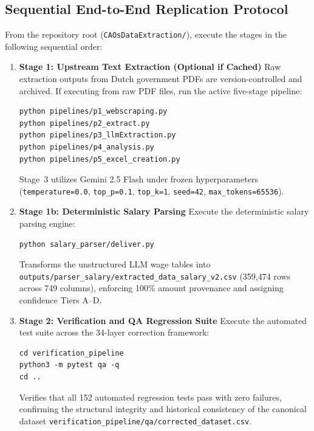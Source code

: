 \subsection{Sequential End-to-End Replication Protocol}
\label{sec:replication_steps}

From the repository root (\nolinkurl{CAOsDataExtraction/}), execute the stages in the following sequential order:

\begin{enumerate}[leftmargin=2.0em]
  \item \textbf{Stage 1: Upstream Text Extraction (Optional if Cached)}
    Raw extraction outputs from Dutch government PDFs are version-controlled and archived. If executing from raw PDF files, run the active five-stage pipeline:
\begin{verbatim}
python pipelines/p1_webscraping.py
python pipelines/p2_extract.py
python pipelines/p3_llmExtraction.py
python pipelines/p4_analysis.py
python pipelines/p5_excel_creation.py
\end{verbatim}
    Stage~3 utilizes Gemini 2.5 Flash under frozen hyperparameters (\texttt{temperature=0.0}, \texttt{top\_p=0.1}, \texttt{top\_k=1}, \texttt{seed=42}, \texttt{max\_tokens=65536}).

  \item \textbf{Stage 1b: Deterministic Salary Parsing}
    Execute the deterministic salary parsing engine:
\begin{verbatim}
python salary_parser/deliver.py
\end{verbatim}
    Transforms the unstructured LLM wage tables into \nolinkurl{outputs/parser_salary/extracted_data_salary_v2.csv} (359,474 rows across 749 columns), enforcing 100\% amount provenance and assigning confidence Tiers A--D.

  \item \textbf{Stage 2: Verification and QA Regression Suite}
    Execute the automated test suite across the 34-layer correction framework:
\begin{verbatim}
cd verification_pipeline
python3 -m pytest qa -q
cd ..
\end{verbatim}
    Verifies that all 152 automated regression tests pass with zero failures, confirming the structural integrity and historical consistency of the canonical dataset \nolinkurl{verification_pipeline/qa/corrected_dataset.csv}.


\end{enumerate}
